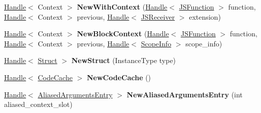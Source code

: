 \begin{DoxyCompactItemize}
\item 
\hypertarget{classv8_1_1internal_1_1_v8___f_i_n_a_l_a39e0572eac28ad8d4d475a5134b15a27}{}\hyperlink{classv8_1_1internal_1_1_handle}{Handle}$<$ Context $>$ {\bfseries New\+With\+Context} (\hyperlink{classv8_1_1internal_1_1_handle}{Handle}$<$ \hyperlink{classv8_1_1internal_1_1_j_s_function}{J\+S\+Function} $>$ function, \hyperlink{classv8_1_1internal_1_1_handle}{Handle}$<$ Context $>$ previous, \hyperlink{classv8_1_1internal_1_1_handle}{Handle}$<$ \hyperlink{classv8_1_1internal_1_1_j_s_receiver}{J\+S\+Receiver} $>$ extension)\label{classv8_1_1internal_1_1_v8___f_i_n_a_l_a39e0572eac28ad8d4d475a5134b15a27}

\item 
\hypertarget{classv8_1_1internal_1_1_v8___f_i_n_a_l_aa576ceb3f188ae8ff71acf3129f11690}{}\hyperlink{classv8_1_1internal_1_1_handle}{Handle}$<$ Context $>$ {\bfseries New\+Block\+Context} (\hyperlink{classv8_1_1internal_1_1_handle}{Handle}$<$ \hyperlink{classv8_1_1internal_1_1_j_s_function}{J\+S\+Function} $>$ function, \hyperlink{classv8_1_1internal_1_1_handle}{Handle}$<$ Context $>$ previous, \hyperlink{classv8_1_1internal_1_1_handle}{Handle}$<$ \hyperlink{classv8_1_1internal_1_1_scope_info}{Scope\+Info} $>$ scope\+\_\+info)\label{classv8_1_1internal_1_1_v8___f_i_n_a_l_aa576ceb3f188ae8ff71acf3129f11690}

\item 
\hypertarget{classv8_1_1internal_1_1_v8___f_i_n_a_l_a875b6da783c0359ad793492f7d37bb3d}{}\hyperlink{classv8_1_1internal_1_1_handle}{Handle}$<$ \hyperlink{classv8_1_1internal_1_1_struct}{Struct} $>$ {\bfseries New\+Struct} (Instance\+Type type)\label{classv8_1_1internal_1_1_v8___f_i_n_a_l_a875b6da783c0359ad793492f7d37bb3d}

\item 
\hypertarget{classv8_1_1internal_1_1_v8___f_i_n_a_l_ab969c3664000dfbfe7c9266831f9cbc2}{}\hyperlink{classv8_1_1internal_1_1_handle}{Handle}$<$ \hyperlink{classv8_1_1internal_1_1_code_cache}{Code\+Cache} $>$ {\bfseries New\+Code\+Cache} ()\label{classv8_1_1internal_1_1_v8___f_i_n_a_l_ab969c3664000dfbfe7c9266831f9cbc2}

\item 
\hypertarget{classv8_1_1internal_1_1_v8___f_i_n_a_l_a3670d67da13a9810e2cb1187979f451a}{}\hyperlink{classv8_1_1internal_1_1_handle}{Handle}$<$ \hyperlink{classv8_1_1internal_1_1_aliased_arguments_entry}{Aliased\+Arguments\+Entry} $>$ {\bfseries New\+Aliased\+Arguments\+Entry} (int aliased\+\_\+context\+\_\+slot)\label{classv8_1_1internal_1_1_v8___f_i_n_a_l_a3670d67da13a9810e2cb1187979f451a}


\end{DoxyCompactItemize}
